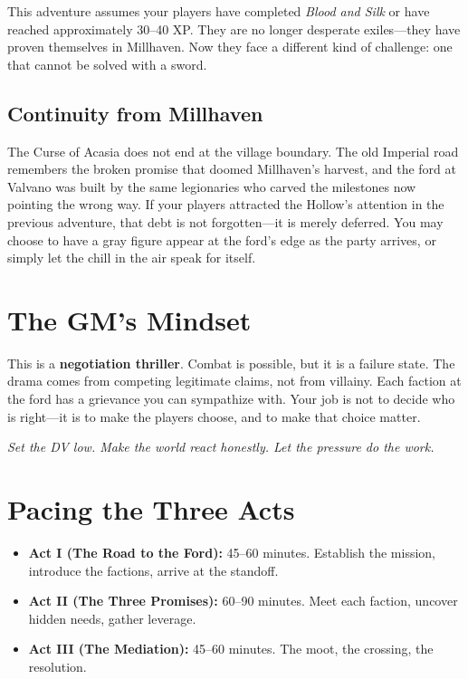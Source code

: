 \documentclass[10pt,twoside]{book}
\begin{document}
This adventure assumes your players have completed \textit{Blood and Silk} or have reached approximately 30--40 XP. They are no longer desperate exiles---they have proven themselves in Millhaven. Now they face a different kind of challenge: one that cannot be solved with a sword.

\subsection*{Continuity from Millhaven}

The Curse of Acasia does not end at the village boundary. The old Imperial road remembers the broken promise that doomed Millhaven's harvest, and the ford at Valvano was built by the same legionaries who carved the milestones now pointing the wrong way. If your players attracted the Hollow's attention in the previous adventure, that debt is not forgotten---it is merely deferred. You may choose to have a gray figure appear at the ford's edge as the party arrives, or simply let the chill in the air speak for itself.

\section*{The GM's Mindset}

This is a \textbf{negotiation thriller}. Combat is possible, but it is a failure state. The drama comes from competing legitimate claims, not from villainy. Each faction at the ford has a grievance you can sympathize with. Your job is not to decide who is right---it is to make the players choose, and to make that choice matter.

\begin{tipsbox}[GM Mantra]
\textit{Set the DV low. Make the world react honestly. Let the pressure do the work.}
\end{tipsbox}

\section*{Pacing the Three Acts}

\begin{itemize}
\item \textbf{Act I (The Road to the Ford):} 45--60 minutes. Establish the mission, introduce the factions, arrive at the standoff.
\item \textbf{Act II (The Three Promises):} 60--90 minutes. Meet each faction, uncover hidden needs, gather leverage.
\item \textbf{Act III (The Mediation):} 45--60 minutes. The moot, the crossing, the resolution.
\end{itemize}
\end{document}
